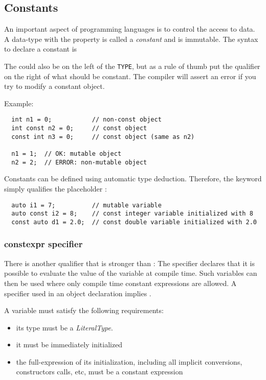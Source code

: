 \subsection{Constants\label{sec:const}}
An important aspect of programming languages is to control the access to data. A data-type with the property  is called a \emph{constant} and is immutable. The syntax to declare a constant is


The  could also be on the left of the \texttt{TYPE}, but as a rule of thumb put the qualifier  on the right of what should be constant. The compiler will assert an error if you try to modify a constant object.

Example:
\begin{verbatim}
  int n1 = 0;           // non-const object
  int const n2 = 0;     // const object
  const int n3 = 0;     // const object (same as n2)

  n1 = 1;  // OK: mutable object
  n2 = 2;  // ERROR: non-mutable object
\end{verbatim}

Constants can be defined using automatic type deduction. Therefore, the keyword  simply qualifies the placeholder :
%
\begin{verbatim}
  auto i1 = 7;          // mutable variable
  auto const i2 = 8;    // const integer variable initialized with 8
  const auto d1 = 2.0;  // const double variable initialized with 2.0
\end{verbatim}

\subsubsection{constexpr specifier}
There is another qualifier that is stronger than : The  specifier declares that it is possible to evaluate the value of the variable at compile time. Such variables can then be used where only compile time constant expressions are allowed. A  specifier used in an object declaration implies .

A  variable must satisfy the following requirements:
\begin{itemize}
  \item its type must be a \emph{LiteralType}.
  \item it must be immediately initialized
  \item the full-expression of its initialization, including all implicit conversions, constructors calls, etc, must be a constant expression
\end{itemize}

